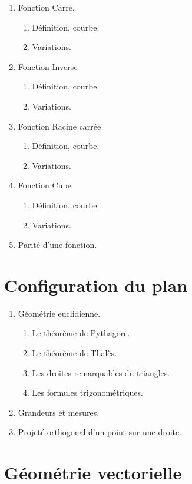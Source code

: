 \documentclass[10pt,a4paper]{article}
\begin{document}
\begin{enumerate}
\item Fonction Carré.
\begin{enumerate}
\item Définition, courbe.
\item Variations.
\end{enumerate} 
\item Fonction Inverse 
\begin{enumerate}
\item Définition, courbe.
\item Variations.
\end{enumerate} 
\item Fonction Racine carrée  
\begin{enumerate}
\item Définition, courbe.
\item Variations.
\end{enumerate}
\item Fonction Cube 
\begin{enumerate}
\item Définition, courbe.
\item Variations.
\end{enumerate}
\item Parité d'une fonction.
\end{enumerate}

 
 

\section{Configuration du plan}


\begin{enumerate}
\item Géométrie euclidienne.
\begin{enumerate}
\item Le théorème de Pythagore.
\item Le théorème de Thalès.
\item Les droites remarquables du triangles.
\item Les formules trigonométriques.
\end{enumerate}
\item Grandeurs et mesures.
\item Projeté orthogonal d'un point sur une droite.
\end{enumerate}

 

\section{Géométrie vectorielle}
\end{document}
